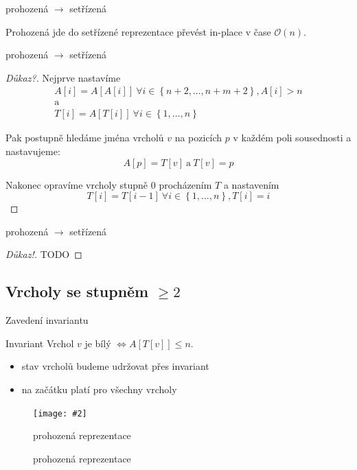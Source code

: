 \documentclass[czech]{beamer}
\makeatletter
\newcommand{\fitimage}[2][\@nil]{
	\begin{figure}
		\begin{adjustbox}{width=0.9\textwidth, totalheight=\textheight-2\baselineskip-2\baselineskip,keepaspectratio}
			\texttt{[image: \#2]}
		\end{adjustbox}
		\def\tmp{#1}%
	 \ifx\tmp\@nnil
			\else
			\caption{#1}
		\fi
	\end{figure}
}
\makeatother
\begin{document}
	\begin{frame}{prohozená $\rightarrow$ setřízená}
		\begin{lemma}
			Prohozená jde do setřízené reprezentace převést in-place v čase $\mathcal{O}\left(n\right)$.
		\end{lemma}
	\end{frame}

	\begin{frame}{prohozená $\rightarrow$ setřízená}
		\begin{proof}[Důkaz?]
			\small
			Nejprve nastavíme 
			\begin{gather*}
				A[i] = A[A[i]]\ \forall i \in \left\{n + 2, \ldots, n + m + 2\right\}, A[i] > n \\
				\text{a} \\
				T[i] = A[T[i]]\ \forall i \in \left\{1, \ldots, n\right\}
			\end{gather*}

			Pak postupně hledáme jména vrcholů $v$ na pozicích $p$ v každém poli sousednosti a nastavujeme:
			$$A[p] = T[v]\ \text{a}\ T\left[v\right] = p$$

			Nakonec opravíme vrcholy stupně $0$ procházením $T$ a nastavením
			$$T[i] = T[i - 1]\ \forall i \in \left\{1, \ldots, n\right\}, T[i] = i$$
		\end{proof}
	\end{frame}

	\begin{frame}{prohozená $\rightarrow$ setřízená}
		\begin{proof}[Důkaz!]
			TODO
		\end{proof}
	\end{frame}

	\subsection{Vrcholy se stupněm $\ge 2$}

	\begin{frame}{Zavedení invariantu}
		\begin{block}{Invariant}
			Vrchol $v$ je bílý $\iff A[T[v]] \le n$.
		\end{block}
		\begin{itemize}
			\item stav vrcholů budeme udržovat přes invariant
			\item na začátku platí pro všechny vrcholy
		\end{itemize}
		\vfill
		\fitimage[prohozená reprezentace]{images/swapped.png}
	\end{frame}
\end{document}
